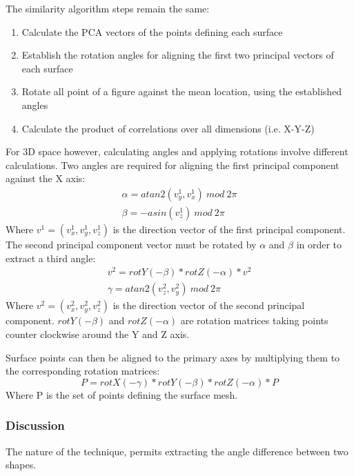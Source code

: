 \documentclass[
    floatsintext
]{article}
\begin{document}
The similarity algorithm steps remain the same: 
\begin{enumerate}
    \item Calculate the PCA vectors of the points defining each surface 
    \item Establish the rotation angles for aligning the first two principal vectors of each surface 
    \item Rotate all point of a figure against the mean location, using the established angles
    \item Calculate the product of correlations over all dimensions (i.e. X-Y-Z) 
\end{enumerate}

For 3D space however, calculating angles and applying rotations involve different calculations.
Two angles are required for aligning the first principal component against the X axis: 
\begin{equation*}
  \begin{split}
    \alpha = atan2(v_y^1,v_x^1)\ mod\ 2\pi\\
    \beta = -asin(v_z^1)\ mod\ 2\pi
  \end{split}
\end{equation*}
Where $v^1=(v_x^1,v_y^1,v_z^1)$ is the direction vector of the first principal component.
The second principal component vector must be rotated by $\alpha$ and $\beta$ in order to extract a third angle: 
\begin{equation*}
  \begin{split}
    v^2 = rotY(-\beta) * rotZ(-\alpha) * v^2\\
    \gamma = atan2(v_z^2,v_y^2)\ mod\ 2\pi 
  \end{split}
\end{equation*}
Where $v^2=(v_x^2,v_y^2,v_z^2)$ is the direction vector of the second principal component. 
$rotY(-\beta)$ and $rotZ(-\alpha)$ are rotation matrices taking points counter clockwise around the Y and Z axis.   

Surface points can then be aligned to the primary axes by multiplying them to the corresponding rotation matrices:  
\begin{equation*}
   P = rotX(-\gamma) * rotY(-\beta) * rotZ(-\alpha) * P
\end{equation*}
Where P is the set of points defining the surface mesh.

\subsubsection{Discussion}
The nature of the technique, permits extracting the angle difference between two shapes.  
\end{document}
